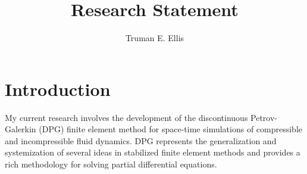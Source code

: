 \documentclass[letterpaper,12pt]{article}
\title{Research Statement}
\author{Truman E. Ellis}
\date{}
\begin{document}
\maketitle







\section*{Introduction}
My current research involves the development of the discontinuous Petrov-Galerkin (DPG) finite element method for space-time 
simulations of compressible and incompressible fluid dynamics.
DPG represents the generalization and systemization of several ideas in stabilized finite element methods and provides a rich methodology
for solving partial differential equations.
\end{document}
